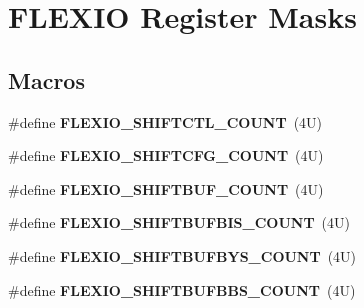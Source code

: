 \hypertarget{group___f_l_e_x_i_o___register___masks}{}\section{F\+L\+E\+X\+IO Register Masks}
\label{group___f_l_e_x_i_o___register___masks}
\subsection*{Macros}
\begin{DoxyCompactItemize}
\item 
\mbox{\label{group___f_l_e_x_i_o___register___masks_gaa94734dbae28741815d51536078cb652}} 
\#define {\bfseries F\+L\+E\+X\+I\+O\+\_\+\+S\+H\+I\+F\+T\+C\+T\+L\+\_\+\+C\+O\+U\+NT}~(4\+U)
\item 
\mbox{\label{group___f_l_e_x_i_o___register___masks_ga589d817ace86aa306a38b35bdfcf85b5}} 
\#define {\bfseries F\+L\+E\+X\+I\+O\+\_\+\+S\+H\+I\+F\+T\+C\+F\+G\+\_\+\+C\+O\+U\+NT}~(4\+U)
\item 
\mbox{\label{group___f_l_e_x_i_o___register___masks_ga94759a6d0a800e1b6db8263fd03ffd26}} 
\#define {\bfseries F\+L\+E\+X\+I\+O\+\_\+\+S\+H\+I\+F\+T\+B\+U\+F\+\_\+\+C\+O\+U\+NT}~(4\+U)
\item 
\mbox{\label{group___f_l_e_x_i_o___register___masks_ga3299dbdc80dd36a93f5b5902fd566a73}} 
\#define {\bfseries F\+L\+E\+X\+I\+O\+\_\+\+S\+H\+I\+F\+T\+B\+U\+F\+B\+I\+S\+\_\+\+C\+O\+U\+NT}~(4\+U)
\item 
\mbox{\label{group___f_l_e_x_i_o___register___masks_ga21674dd608172db30db851b6ce014d86}} 
\#define {\bfseries F\+L\+E\+X\+I\+O\+\_\+\+S\+H\+I\+F\+T\+B\+U\+F\+B\+Y\+S\+\_\+\+C\+O\+U\+NT}~(4\+U)
\item 
\mbox{\label{group___f_l_e_x_i_o___register___masks_ga1074fc1e6d1d57fabb786734209ac775}} 
\#define {\bfseries F\+L\+E\+X\+I\+O\+\_\+\+S\+H\+I\+F\+T\+B\+U\+F\+B\+B\+S\+\_\+\+C\+O\+U\+NT}~(4\+U)
\item 
\mbox{\label{group___f_l_e_x_i_o___register___masks_ga3290fd2e6e3c063a89827141f0d8f169}} 

\end{DoxyCompactItemize}
